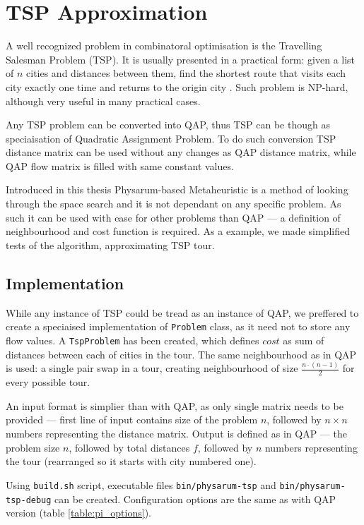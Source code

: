 \chapter{TSP Approximation}
\label{chapter:tsp}

A well recognized problem in combinatoral optimisation is the Travelling Salesman Problem (TSP). It is usually presented in a practical form: given a list of $n$ cities and distances between them, find the shortest route that visits each city exactly one time and returns to the origin city \cite{kruskal1956shortest}. Such problem is NP-hard, although very useful in many practical cases.

Any TSP problem can be converted into QAP, thus TSP can be though as speciaisation of Quadratic Assignment Problem. To do such conversion TSP distance matrix can be used without any changes as QAP distance matrix, while QAP flow matrix is filled with same constant values.

Introduced in this thesis Physarum-based Metaheuristic is a method of looking through the space search and it is not dependant on any specific problem. As such it can be used with ease for other problems than QAP --- a definition of neighbourhood and cost function is required. As a example, we made simplified tests of the algorithm, approximating TSP tour.


\section*{Implementation}

While any instance of TSP could be tread as an instance of QAP, we preffered to create a speciaised implementation of \texttt{Problem} class, as it need not to store any flow values. A \texttt{TspProblem} has been created, which defines $cost$ as sum of distances between each of cities in the tour. The same neighbourhood as in QAP is used: a single pair swap in a tour, creating neighbourhood of size $\frac{n\cdot(n-1)}{2}$ for every possible tour.

An input format is simplier than with QAP, as only single matrix needs to be provided --- first line of input contains size of the problem $n$, followed by $n{\times}n$ numbers representing the distance matrix. Output is defined as in QAP --- the problem size $n$, followed by total distances $f$, followed by $n$ numbers representing the tour (rearranged so it starts with city numbered one).

Using \texttt{build.sh} script, executable files \texttt{bin/physarum-tsp} and \texttt{bin/physarum-tsp-debug} can be created. Configuration options are the same as with QAP version (table \ref{table:pi_options}).


